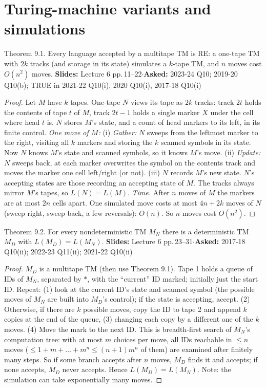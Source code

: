 \documentclass[10.5pt,a4paper]{article}
\newcommand{\src}[2]{{\footnotesize\color{gray!70!black}\textbf{Slides:} #1\enspace$\cdot$\enspace\textbf{Asked:} #2}\par}
\begin{document}
\section{Turing-machine variants and simulations}

\begin{thm}{Theorem 9.1. Every language accepted by a multitape TM is RE: a one-tape TM with $2k$ tracks (and storage in its state)
simulates a $k$-tape TM, and $n$ moves cost $O(n^2)$ moves.}
\src{Lecture 6 pp.\,11--22}{2023-24 Q10; 2019-20 Q10(b); TRUE in 2021-22 Q10(i), 2020 Q10(i), 2017-18 Q10(i)}\end{thm}
\begin{proof}
Let $M$ have $k$ tapes. One-tape $N$ views its tape as $2k$ tracks: track $2t$ holds the contents of tape $t$ of $M$, track $2t-1$ holds a
single marker $X$ under the cell where head $t$ is. $N$ stores $M$'s state, and a count of head markers to its left, in its finite control.
\emph{One move of $M$:} (i) \emph{Gather:} $N$ sweeps from the leftmost marker to the right, visiting all $k$ markers and storing the $k$
scanned symbols in its state. Now $N$ knows $M$'s state and scanned symbols, so it knows $M$'s move. (ii) \emph{Update:} $N$ sweeps back,
at each marker overwrites the symbol on the contents track and moves the marker one cell left/right (or not). (iii) $N$ records $M$'s new
state. $N$'s accepting states are those recording an accepting state of $M$. The tracks always mirror $M$'s tapes, so $L(N)=L(M)$.
\emph{Time.} After $n$ moves of $M$ the markers are at most $2n$ cells apart. One simulated move costs at most $4n+2k$ moves of $N$
(sweep right, sweep back, a few reversals): $O(n)$. So $n$ moves cost $O(n^2)$.
\end{proof}

\begin{thm}{Theorem 9.2. For every nondeterministic TM $M_N$ there is a deterministic TM $M_D$ with $L(M_D)=L(M_N)$.}
\src{Lecture 6 pp.\,23--31}{2017-18 Q10(ii); 2022-23 Q11(ii); 2021-22 Q10(ii)}\end{thm}
\begin{proof}
$M_D$ is a multitape TM (then use Theorem 9.1). Tape 1 holds a queue of IDs of $M_N$, separated by $*$, with the ``current'' ID marked;
initially just the start ID. Repeat: (1) look at the current ID's state and scanned symbol (the possible moves of $M_N$ are built into $M_D$'s
control); if the state is accepting, accept. (2) Otherwise, if there are $k$ possible moves, copy the ID to tape 2 and append $k$ copies at the end
of the queue, (3) changing each copy by a different one of the $k$ moves. (4) Move the mark to the next ID. This is breadth-first search of
$M_N$'s computation tree: with at most $m$ choices per move, all IDs reachable in $\le n$ moves ($\le1+m+\dots+m^n\le(n+1)m^n$ of them) are
examined after finitely many steps. So if some branch accepts after $n$ moves, $M_D$ finds it and accepts; if none accepts, $M_D$ never
accepts. Hence $L(M_D)=L(M_N)$. Note: the simulation can take exponentially many moves.
\end{proof}
\end{document}
